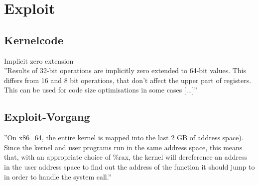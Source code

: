 \documentclass[11pt,a4paper]{article}
\begin{document}
\section{Exploit}
\subsection{Kernelcode}
Implicit zero extension\\
''Results of 32-bit operations are implicitly zero extended to 64-bit values. This differs from 16 and 8 bit operations, that don't affect the upper part of registers. This can be used for code size optimisations in some cases [...]'' \cite{X860}
\subsection{Exploit-Vorgang}
''On x86\_64, the entire kernel is mapped into the last 2 GB of address space). Since the kernel and user programs run in the same address space, this means that, with an appropriate choice of \%rax, the kernel will dereference an address in the user address space to find out the address of the function it should jump to in order to handle the system call.'' \cite{ELH0}

\nocite{*}
\printbibliography
{}
\end{document}
